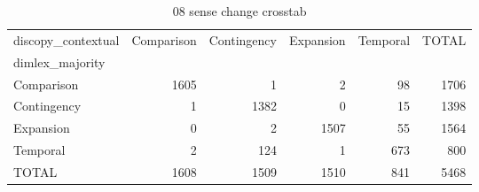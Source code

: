 \begin{table}
\caption{08 sense change crosstab}
\begin{tabular}{lrrrrr}
\toprule
discopy_contextual & Comparison & Contingency & Expansion & Temporal & TOTAL \\
dimlex_majority &  &  &  &  &  \\
\midrule
Comparison & 1605 & 1 & 2 & 98 & 1706 \\
Contingency & 1 & 1382 & 0 & 15 & 1398 \\
Expansion & 0 & 2 & 1507 & 55 & 1564 \\
Temporal & 2 & 124 & 1 & 673 & 800 \\
TOTAL & 1608 & 1509 & 1510 & 841 & 5468 \\
\bottomrule
\end{tabular}
\end{table}
